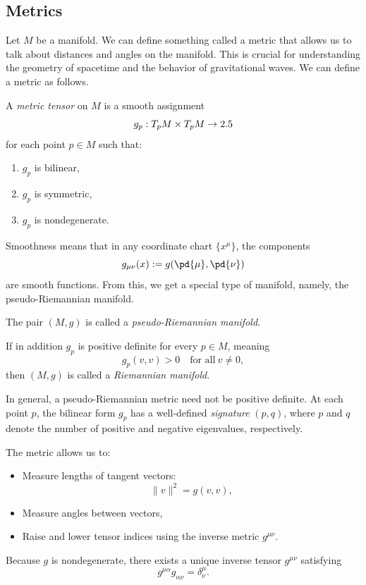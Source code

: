 \subsection{Metrics} Let $M$ be a manifold. We can define something called a metric that allows us to talk about distances and angles on the manifold. This is crucial for understanding the geometry of spacetime and the behavior of gravitational waves. We can define a metric as follows.
\begin{definition}
  A \emph{metric tensor} on $M$ is a smooth assignment
  \[%
    g_p : T_pM \times T_pM \to \R
  \]%
  for each point $p \in M$ such that:
  \begin{enumerate}
    \item $g_p$ is bilinear,
    \item $g_p$ is symmetric,
    \item $g_p$ is nondegenerate.
  \end{enumerate}
\end{definition}

Smoothness means that in any coordinate chart $\{x^\mu\}$, the components
\[%
  g_{\mu\nu}(x) := g\!\left(\pd{\mu}, \pd{\nu}\right)
\]%
are smooth functions. From this, we get a special type of manifold, namely, the pseudo-Riemannian manifold.
\begin{definition}
  The pair $(M, g)$ is called a \emph{pseudo-Riemannian manifold}.

  If in addition $g_p$ is positive definite for every $p \in M$, meaning
  \[%
    g_p(v,v) > 0 \quad \text{for all}~v \neq 0
  ,\]%
  then $(M, g)$ is called a \emph{Riemannian manifold}.
\end{definition}

In general, a pseudo-Riemannian metric need not be positive definite. At each point $p$, the bilinear form $g_p$ has a well-defined \emph{signature} $(p, q)$, where $p$ and $q$ denote the number of positive and negative eigenvalues, respectively.

The metric allows us to:
\begin{itemize}
  \item Measure lengths of tangent vectors:
    \[%
      \|v\|^2 = g(v,v)
    ,\]%
  \item Measure angles between vectors,
  \item Raise and lower tensor indices using the inverse metric $g^{\mu\nu}$.
\end{itemize}

Because $g$ is nondegenerate, there exists a unique inverse tensor $g^{\mu\nu}$ satisfying
\[%
  g^{\mu\alpha} g_{\alpha\nu} = \delta^\mu_{\nu}
.\]%

